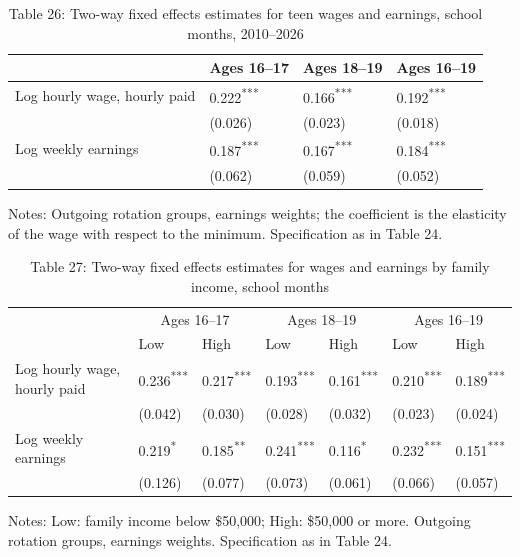 \documentclass[12pt]{article}
\begin{document}
\begin{table}
\centering
\caption{Table 26: Two-way fixed effects estimates for teen wages and earnings, school months, 2010--2026}

\small
\begin{tabular}{p{}p{}p{}p{}}
\toprule
 & Ages 16--17 & Ages 18--19 & Ages 16--19 \\
\midrule
Log hourly wage, hourly paid & 0.222\textsuperscript{***} & 0.166\textsuperscript{***} & 0.192\textsuperscript{***} \\
 & (0.026) & (0.023) & (0.018) \\
Log weekly earnings & 0.187\textsuperscript{***} & 0.167\textsuperscript{***} & 0.184\textsuperscript{***} \\
 & (0.062) & (0.059) & (0.052) \\
\bottomrule
\end{tabular}



\noindent\small Notes: Outgoing rotation groups, earnings weights; the coefficient is the elasticity of the wage with respect to the minimum. Specification as in Table 24.

\end{table}

\begin{table}
\centering
\caption{Table 27: Two-way fixed effects estimates for wages and earnings by family income, school months}

\small
\begin{tabular}{p{}p{}p{}p{}p{}p{}p{}}
\toprule
 & \multicolumn{2}{c}{Ages 16--17} & \multicolumn{2}{c}{Ages 18--19} & \multicolumn{2}{c}{Ages 16--19} \\

 & Low & High & Low & High & Low & High \\
\midrule
Log hourly wage, hourly paid & 0.236\textsuperscript{***} & 0.217\textsuperscript{***} & 0.193\textsuperscript{***} & 0.161\textsuperscript{***} & 0.210\textsuperscript{***} & 0.189\textsuperscript{***} \\
 & (0.042) & (0.030) & (0.028) & (0.032) & (0.023) & (0.024) \\
Log weekly earnings & 0.219\textsuperscript{*} & 0.185\textsuperscript{**} & 0.241\textsuperscript{***} & 0.116\textsuperscript{*} & 0.232\textsuperscript{***} & 0.151\textsuperscript{***} \\
 & (0.126) & (0.077) & (0.073) & (0.061) & (0.066) & (0.057) \\
\bottomrule
\end{tabular}



\noindent\small Notes: Low: family income below \$50,000; High: \$50,000 or more. Outgoing rotation groups, earnings weights. Specification as in Table 24.

\end{table}
\end{document}
